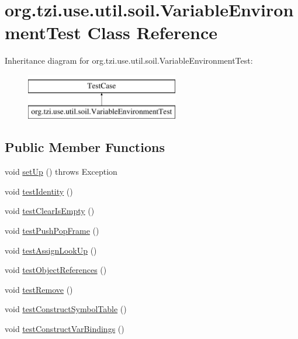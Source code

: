 \hypertarget{classorg_1_1tzi_1_1use_1_1util_1_1soil_1_1_variable_environment_test}{\section{org.\-tzi.\-use.\-util.\-soil.\-Variable\-Environment\-Test Class Reference}
\label{classorg_1_1tzi_1_1use_1_1util_1_1soil_1_1_variable_environment_test}
}
Inheritance diagram for org.\-tzi.\-use.\-util.\-soil.\-Variable\-Environment\-Test\-:\begin{figure}[H]
\begin{center}
\leavevmode
\includegraphics[height=2.000000cm]{classorg_1_1tzi_1_1use_1_1util_1_1soil_1_1_variable_environment_test}
\end{center}
\end{figure}
\subsection*{Public Member Functions}
\begin{DoxyCompactItemize}
\item 
void \hyperlink{classorg_1_1tzi_1_1use_1_1util_1_1soil_1_1_variable_environment_test_ae48f2f24376f0472fc52e02dc0fb6b82}{set\-Up} ()  throws Exception 
\item 
void \hyperlink{classorg_1_1tzi_1_1use_1_1util_1_1soil_1_1_variable_environment_test_a1486762ae9f0476709686a3f47d2686e}{test\-Identity} ()
\item 
void \hyperlink{classorg_1_1tzi_1_1use_1_1util_1_1soil_1_1_variable_environment_test_a5b5088833e7976fdd9b9e967038a7c5e}{test\-Clear\-Is\-Empty} ()
\item 
void \hyperlink{classorg_1_1tzi_1_1use_1_1util_1_1soil_1_1_variable_environment_test_a0a1ec80a4f8596ffff71343e4b7e4207}{test\-Push\-Pop\-Frame} ()
\item 
void \hyperlink{classorg_1_1tzi_1_1use_1_1util_1_1soil_1_1_variable_environment_test_a3f5431cd73379c315c9e985ddc588986}{test\-Assign\-Look\-Up} ()
\item 
void \hyperlink{classorg_1_1tzi_1_1use_1_1util_1_1soil_1_1_variable_environment_test_aed00efbcf715d060c6ec312d40171d86}{test\-Object\-References} ()
\item 
void \hyperlink{classorg_1_1tzi_1_1use_1_1util_1_1soil_1_1_variable_environment_test_a3b04be61a0a7139273c935372ef7f02e}{test\-Remove} ()
\item 
void \hyperlink{classorg_1_1tzi_1_1use_1_1util_1_1soil_1_1_variable_environment_test_a871b97ffbcbe8420bf0c576dc19d0f4a}{test\-Construct\-Symbol\-Table} ()
\item 
void \hyperlink{classorg_1_1tzi_1_1use_1_1util_1_1soil_1_1_variable_environment_test_a8c7f18d6a63d97d7830b201a303b38e4}{test\-Construct\-Var\-Bindings} ()
\end{DoxyCompactItemize}



